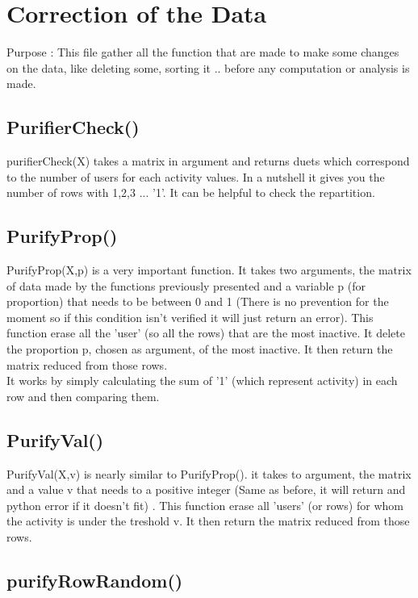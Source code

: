 \documentclass{report}
\begin{document}
\section{Correction of the Data}

Purpose : This file gather all the function that are made to make some changes on the data, like deleting some, sorting it .. before any computation or analysis is made.

\subsection{PurifierCheck()}

purifierCheck(X) takes a matrix in argument and returns duets which correspond to the number of users for each activity values. In a nutshell it gives you the number of rows with 1,2,3 ... '1'.  
It can be helpful to check the repartition. 

\subsection{PurifyProp()} 

PurifyProp(X,p) is a very important function. It takes two arguments, the matrix of data made by the functions previously presented and a variable p (for proportion) that needs to be between 0 and 1 (There is no prevention for the moment so if this condition isn't verified it will just return an error). This function erase all the 'user' (so all the rows) that are the most inactive. It delete the proportion p, chosen as argument, of the most inactive. It then return the matrix reduced from those rows.\\

It works by simply calculating the sum of '1' (which represent activity) in each row and then comparing them.

\subsection{PurifyVal()}

PurifyVal(X,v) is nearly similar to PurifyProp(). it takes to argument, the matrix and a value v that needs to a positive integer (Same as before, it will return and python error if it doesn't fit) . This function erase all 'users' (or rows) for whom the activity is under the treshold v. It then return the matrix reduced from those rows.\\

\subsection{purifyRowRandom()}
\end{document}
